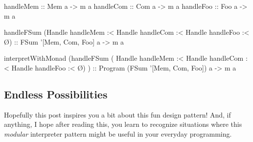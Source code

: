 \documentclass[]{article}
\newenvironment{Shaded}{}{}
\newcommand{\CharTok}[1]{\textcolor[rgb]{0.25,0.44,0.63}{#1}}
\newcommand{\DataTypeTok}[1]{\textcolor[rgb]{0.56,0.13,0.00}{#1}}
\newcommand{\FunctionTok}[1]{\textcolor[rgb]{0.02,0.16,0.49}{#1}}
\newcommand{\NormalTok}[1]{#1}
\newcommand{\OtherTok}[1]{\textcolor[rgb]{0.00,0.44,0.13}{#1}}
\begin{document}
\begin{Shaded}
\begin{Highlighting}[]
\OtherTok{handleMem ::} \DataTypeTok{Mem}\NormalTok{ a }\OtherTok{->}\NormalTok{ m a}
\OtherTok{handleCom ::} \DataTypeTok{Com}\NormalTok{ a }\OtherTok{->}\NormalTok{ m a}
\OtherTok{handleFoo ::} \DataTypeTok{Foo}\NormalTok{ a }\OtherTok{->}\NormalTok{ m a}

\NormalTok{handleFSum (}\DataTypeTok{Handle}\NormalTok{ handleMem }\FunctionTok{:<} \DataTypeTok{Handle}\NormalTok{ handleCom }\FunctionTok{:<} \DataTypeTok{Handle}\NormalTok{ handleFoo }\FunctionTok{:<}\NormalTok{ Ø)}
\OtherTok{    ::} \DataTypeTok{FSum} \CharTok{'[Mem, Com, Foo] a -> m a}

\NormalTok{interpretWithMonad}
\NormalTok{        (handleFSum ( }\DataTypeTok{Handle}\NormalTok{ handleMem}
                   \FunctionTok{:<} \DataTypeTok{Handle}\NormalTok{ handleCom}
                   \FunctionTok{:<} \DataTypeTok{Handle}\NormalTok{ handleFoo}
                   \FunctionTok{:<}\NormalTok{ Ø)}
\NormalTok{        )}
\OtherTok{    ::} \DataTypeTok{Program}\NormalTok{ (}\DataTypeTok{FSum} \CharTok{'[Mem, Com, Foo]) a -> m a}
\end{Highlighting}
\end{Shaded}

\hypertarget{endless-possibilities}{%
\subsection{Endless Possibilities}\label{endless-possibilities}}

Hopefully this post inspires you a bit about this fun design pattern! And, if
anything, I hope after reading this, you learn to recognize situations where
this \emph{modular} interpreter pattern might be useful in your everyday
programming.
\end{document}
